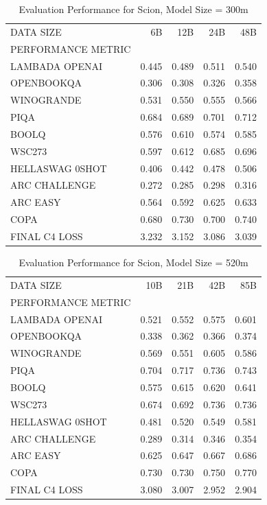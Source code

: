 \begin{table}
[H] \centering \caption{Evaluation Performance for Scion, Model Size = 300m}
\label{tab:eval-performance-scion-300M}
\begin{tabular}{lrrrr}
\toprule
DATA SIZE & 6B & 12B & 24B & 48B \\
PERFORMANCE METRIC &  &  &  &  \\
\midrule
LAMBADA OPENAI & 0.445 & 0.489 & 0.511 & 0.540 \\
OPENBOOKQA & 0.306 & 0.308 & 0.326 & 0.358 \\
WINOGRANDE & 0.531 & 0.550 & 0.555 & 0.566 \\
PIQA & 0.684 & 0.689 & 0.701 & 0.712 \\
BOOLQ & 0.576 & 0.610 & 0.574 & 0.585 \\
WSC273 & 0.597 & 0.612 & 0.685 & 0.696 \\
HELLASWAG 0SHOT & 0.406 & 0.442 & 0.478 & 0.506 \\
ARC CHALLENGE & 0.272 & 0.285 & 0.298 & 0.316 \\
ARC EASY & 0.564 & 0.592 & 0.625 & 0.633 \\
COPA & 0.680 & 0.730 & 0.700 & 0.740 \\
FINAL C4 LOSS & 3.232 & 3.152 & 3.086 & 3.039 \\
\bottomrule
\end{tabular}
\end{table}


\begin{table}
[H] \centering \caption{Evaluation Performance for Scion, Model Size = 520m}
\label{tab:eval-performance-scion-520M}
\begin{tabular}{lrrrr}
\toprule
DATA SIZE & 10B & 21B & 42B & 85B \\
PERFORMANCE METRIC &  &  &  &  \\
\midrule
LAMBADA OPENAI & 0.521 & 0.552 & 0.575 & 0.601 \\
OPENBOOKQA & 0.338 & 0.362 & 0.366 & 0.374 \\
WINOGRANDE & 0.569 & 0.551 & 0.605 & 0.586 \\
PIQA & 0.704 & 0.717 & 0.736 & 0.743 \\
BOOLQ & 0.575 & 0.615 & 0.620 & 0.641 \\
WSC273 & 0.674 & 0.692 & 0.736 & 0.736 \\
HELLASWAG 0SHOT & 0.481 & 0.520 & 0.549 & 0.581 \\
ARC CHALLENGE & 0.289 & 0.314 & 0.346 & 0.354 \\
ARC EASY & 0.625 & 0.647 & 0.667 & 0.686 \\
COPA & 0.730 & 0.730 & 0.750 & 0.770 \\
FINAL C4 LOSS & 3.080 & 3.007 & 2.952 & 2.904 \\
\bottomrule
\end{tabular}
\end{table}


